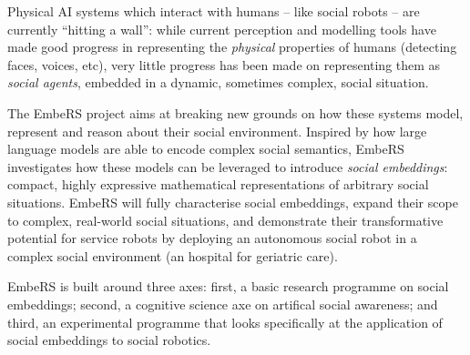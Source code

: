 \documentclass[11pt,a4paper]{report}
\newcommand{\project}{EmbeRS\xspace}
\begin{document}
Physical AI systems which interact with humans -- like social robots -- are
currently ``hitting a wall'': while current perception and modelling tools have
made good progress in representing the \emph{physical} properties of humans (detecting
faces, voices, etc), very little progress has been made on representing them as
\emph{social agents}, embedded in a dynamic, sometimes complex, social situation.



The \project project aims at breaking new grounds on how these systems
model, represent and reason about their social environment. Inspired by how
large language models are able to encode complex social semantics, \project
investigates how these models can be leveraged to introduce \emph{social
embeddings}: compact, highly expressive mathematical representations of
arbitrary social situations.  \project
will fully characterise social embeddings, expand their scope to complex,
real-world social situations, and demonstrate their transformative potential
for service robots by deploying an autonomous social robot in a complex social
environment (an hospital for geriatric care).

\project is built around three axes: first, a basic research programme on
social embeddings; second, a cognitive science axe on artifical social
awareness; and third, an experimental programme that looks specifically at the
application of social embeddings to social robotics.

%
%
%
\end{document}

